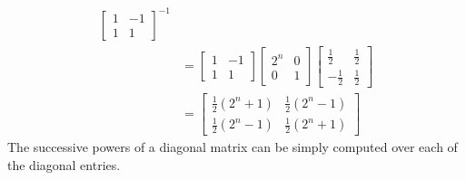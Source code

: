 \begin{exmp}
\begin{solution}
\begin{align*}
\begin{bmatrix}
1 & -1 \\
1 & 1
\end{bmatrix}^{-1} \\
&= 
\begin{bmatrix}
1 & -1 \\
1 & 1
\end{bmatrix}
\begin{bmatrix}
2^n & 0 \\
0 & 1
\end{bmatrix}
\begin{bmatrix}
\frac{1}{2} & \frac{1}{2} \\
-\frac{1}{2} & \frac{1}{2} 
\end{bmatrix} \\
&= \begin{bmatrix}
\frac{1}{2}(2^n + 1) & \frac{1}{2}(2^n - 1) \\
\frac{1}{2}(2^n - 1) & \frac{1}{2}(2^n + 1)
\end{bmatrix}
\end{align*}
The successive powers of a diagonal matrix can be simply computed over each of the diagonal entries.
\end{solution}
\end{exmp}


